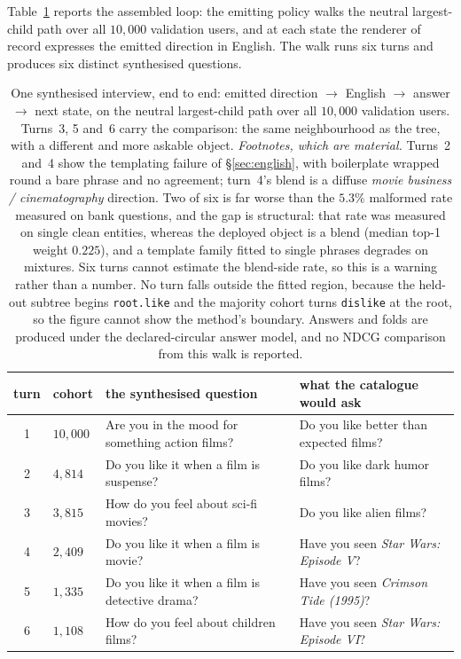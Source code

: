 \documentclass[11pt]{article}
\begin{document}
Table~\ref{tab:demo} reports the assembled loop: the emitting policy walks the neutral largest-child
path over all $10{,}000$ validation users, and at each state the renderer of record expresses the
emitted direction in English. The walk runs six turns and produces six distinct synthesised questions.

\begin{table}[htbp]
\centering\footnotesize\setlength{\tabcolsep}{5pt}
\begin{tabular}{@{}clp{}p{}@{}}
\toprule
\textbf{turn} & \textbf{cohort} & \textbf{the synthesised question} & \textbf{what the catalogue
would ask} \\
\midrule
1 & $10{,}000$ & Are you in the mood for something action films? & Do you like better than expected
films? \\
2 & $4{,}814$ & Do you like it when a film is suspense? & Do you like dark humor films? \\
3 & $3{,}815$ & How do you feel about sci-fi movies? & Do you like alien films? \\
4 & $2{,}409$ & Do you like it when a film is movie? & Have you seen \emph{Star Wars: Episode V}? \\
5 & $1{,}335$ & Do you like it when a film is detective drama? & Have you seen
\emph{Crimson Tide (1995)}? \\
6 & $1{,}108$ & How do you feel about children films? & Have you seen \emph{Star Wars:
Episode VI}? \\
\bottomrule
\end{tabular}
\caption{One synthesised interview, end to end: emitted direction $\to$ English $\to$ answer $\to$
next state, on the neutral largest-child path over all $10{,}000$ validation users. Turns~3, 5 and~6
carry the comparison: the same neighbourhood as the tree, with a different and more askable object.
\emph{Footnotes, which are material.} Turns~2 and~4 show the templating failure of
\S\ref{sec:english}, with boilerplate wrapped round a bare phrase and no agreement; turn~4's blend is
a diffuse \emph{movie business / cinematography} direction. Two of six is far worse than the $5.3\%$
malformed rate measured on bank questions, and the gap is structural: that rate was measured on single
clean entities, whereas the deployed object is a blend (median top-1 weight $0.225$), and a template
family fitted to single phrases degrades on mixtures. Six turns cannot estimate the blend-side rate,
so this is a warning rather than a number. No turn falls outside the fitted region, because the
held-out subtree begins \texttt{root.like} and the majority cohort turns \texttt{dislike} at the root,
so the figure cannot show the method's boundary. Answers and folds are produced under the
declared-circular answer model, and no NDCG comparison from this walk is reported.}
\label{tab:demo}
\end{table}
\end{document}
